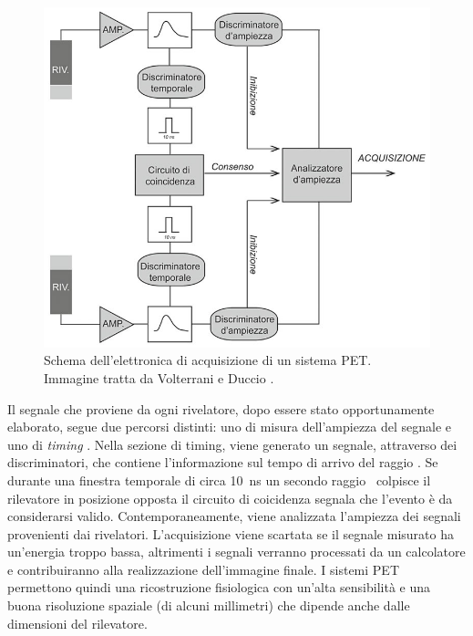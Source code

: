 \begin{figure}[tbh]
	\centering
	\includegraphics[width=0.6\linewidth]{./ImageFiles/circuito pet.jpg}
	\caption{Schema dell'elettronica di acquisizione di un sistema PET. Immagine tratta da Volterrani e Duccio \cite{Volterrani2010}.}
	\label{fig:pet_circuit}
\end{figure} 
Il segnale che proviene da ogni rivelatore, dopo essere stato opportunamente elaborato, segue due percorsi distinti: uno di misura dell'ampiezza del segnale e uno di \textit{timing} \cite{Volterrani2010}. Nella sezione di timing, viene generato un segnale, attraverso dei discriminatori, che contiene l'informazione sul tempo di arrivo del raggio \textgamma. Se durante una finestra temporale di circa \SI{10}{\nano\second} un secondo raggio \textgamma\ colpisce il rilevatore in posizione opposta il circuito di coicidenza segnala che l'evento è da considerarsi valido. Contemporaneamente, viene analizzata l'ampiezza dei segnali provenienti dai rivelatori. L'acquisizione viene scartata se il segnale misurato ha un'energia troppo bassa, altrimenti i segnali verranno processati da un calcolatore e contribuiranno alla realizzazione dell'immagine finale. I sistemi PET permettono quindi una ricostruzione fisiologica con un'alta sensibilità e una buona risoluzione spaziale (di alcuni millimetri) che dipende anche dalle dimensioni del rilevatore.

